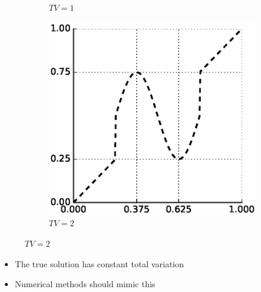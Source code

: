 \documentclass[11pt]{beamer}
\begin{document}
\begin{frame}
\begin{figure}[h]
\begin{subfigure}{0.3\textwidth}
      \caption{$TV = 1$}
    \end{subfigure}
    \begin{subfigure}{0.3\textwidth}
      \includegraphics[width=\textwidth]{figures/tv/higher}
      \caption{$TV = 2$}
    \end{subfigure}
  \end{figure}
  \begin{itemize}
  \item The true solution has constant total variation
  \item Numerical methods should mimic this
  \end{itemize}
\end{frame}
\end{document}
